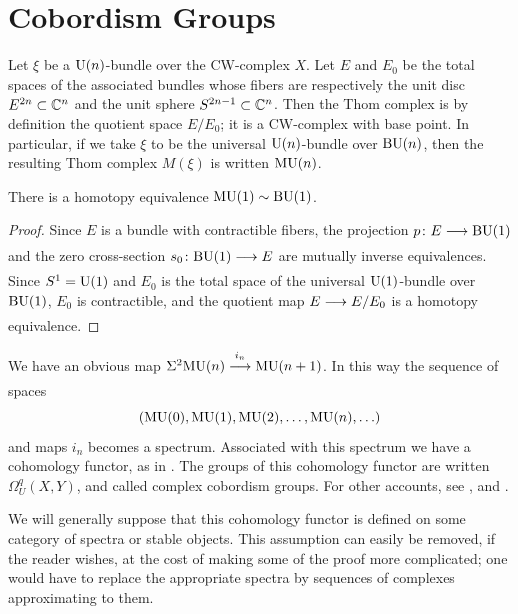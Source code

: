 \documentclass[../main]{subfiles}
\begin{document}
\chapter{Cobordism Groups}
\label{sec:p1c2}

Let $\xi$ be a $\mathrm{U}(n)$-bundle over the CW-complex $X$. 
Let $E$ and $E_0$ be the total spaces of the associated bundles whose fibers are respectively the unit disc $E^{2n} \subset \mathbb{C}^n$ and the unit sphere $S^{2n-1} \subset \mathbb{C}^n$.
Then the Thom complex is by definition the quotient space $E/E_0$; it is a CW-complex with base point. 
In particular, if we take $\xi$ to be the universal $\mathrm{U}(n)$-bundle over $\mathrm{BU}(n)$, then the resulting Thom complex $M(\xi)$ is written $\mathrm{MU}(n)$.
\begin{example}
\label{ex:p1c02.1}
There is a homotopy equivalence $\mathrm{MU}(1) \sim \mathrm{BU}(1)$.
\end{example}
\begin{proof}
Since $E$ is a bundle with contractible fibers, the projection $p\colon E \lar{} \te{BU}(1)$ and the zero cross-section $s_0\colon \te{BU}(1) \lar{} E$ are mutually inverse equivalences. 
Since $S^{1} = \mathrm{U}(1)$ and $E_0$ is the total space of the universal $\mathrm{U}(1)$-bundle over $\mathrm{BU}(1)$, $E_0$ is contractible, and the quotient map $E \lar{} E/E_0$ is a homotopy equivalence.
\end{proof}

We have an obvious map $\Sigma^2 \te{MU}(n) \stackrel{i_n}{\lar{}} \te{MU}(n+1)$. 
In this way the sequence of spaces 
\begin{equation*}
	(\mathrm{MU}(0), \mathrm{MU}(1), \mathrm{MU}(2), \ldots , \mathrm{MU}(n), \ldots)
\end{equation*}
and maps $i_n$ becomes a spectrum. 
Associated with this spectrum we have a cohomology functor, as in \cite{whitehead}. 
The groups of this cohomology functor are written $\Omega_U^q (X, Y)$, and called complex cobordism groups. 
For other accounts, see \cite{atiyah}, and \cite[pp.~25--28]{connerfloyd}.

We will generally suppose that this cohomology functor is defined on some category of spectra or stable objects. 
This assumption can easily be removed, if the reader wishes, at the cost of making some of the proof more complicated; one would have to replace the appropriate spectra by sequences of complexes approximating to them.
\end{document}
